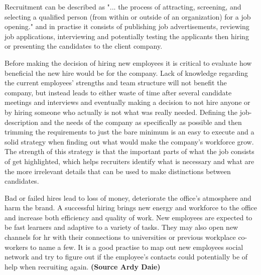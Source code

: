 \documentclass[11pt,a4paper,oneside,article]{memoir}
\begin{document}
Recruitment can be described as "... the process of attracting, screening, and selecting a qualified person (from within or outside of an organization) for a job opening." \cite[p.~1]{konceptanalytics:book} and in practise it consists of publishing job advertisements, reviewing job applications, interviewing and potentially testing the applicants then hiring or presenting the candidates to the client company.

Before making the decision of hiring new employees it is critical to evaluate how beneficial the new hire would be for the company. Lack of knowledge regarding the current employees' strengths and team structure will not benefit the company, but instead leads to either waste of time after several candidate meetings and interviews and eventually making a decision to not hire anyone or by hiring someone who actually is not what %
was really needed. Defining the job-description and the needs of the company as specifically as possible and then trimming the requirements to just the bare minimum is an easy to execute and a solid strategy when finding out what would make the company's workforce grow. The strength of this strategy is that the important parts of what the job consists of get highlighted, which helps recruiters identify what is necessary and what are the more irrelevant details that can be used to make distinctions between candidates.

Bad or failed hires lead to loss of money, deteriorate the office's atmosphere and harm the brand. A successful hiring brings new energy and workforce to the office and increase both efficiency and quality of work. New employees are expected to be fast learners and adaptive to a variety of tasks. \cite[p.~100]{viitala:book} They may also open new channels for \gls{hr} with their connections to universities or previous workplace co-workers to name a few. It is a good practise to map out new employees social network and try to figure out if the employee's contacts could potentially be of help when recruiting again. \textbf{(Source Ardy Daie)}
\end{document}
